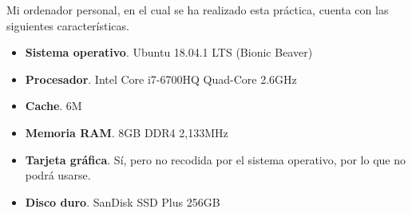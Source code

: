 Mi ordenador personal, en el cual se ha realizado esta práctica, cuenta con las siguientes características.

\begin{itemize}
  \item \textbf{Sistema operativo}. Ubuntu 18.04.1 LTS (Bionic Beaver)
  \item \textbf{Procesador}. Intel Core i7-6700HQ Quad-Core 2.6GHz
  \item \textbf{Cache}. 6M
  \item \textbf{Memoria RAM}. 8GB DDR4 2,133MHz
  \item \textbf{Tarjeta gráfica}. Sí, pero no recodida por el sistema operativo, por lo que no podrá usarse.
  \item \textbf{Disco duro}. SanDisk SSD Plus 256GB
\end{itemize}
